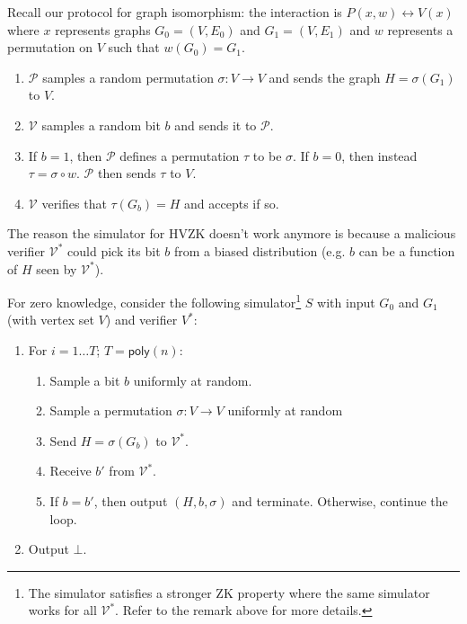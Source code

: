 \documentclass[12pt]{tufte-book}
\begin{document}
Recall our protocol for graph isomorphism: the interaction is $P(x,w) \leftrightarrow V(x)$ where $x$ represents graphs $G_0 = (V, E_0)$ and $G_1 = (V, E_1)$ and $w$ represents a permutation on $V$ such that $w (G_0) = G_1$.

\begin{enumerate}
\item $\mathcal{P}$ samples a random permutation $\sigma: V \to V$ and sends the graph $H = \sigma(G_1)$ to $V$.

\item $\mathcal{V}$ samples a random bit $b$ and sends it to $\mathcal{P}$.

\item If $b = 1$, then $\mathcal{P}$ defines a permutation $\tau$ to be $\sigma$. If $b = 0$, then instead $\tau = \sigma \circ w$. $\mathcal{P}$ then sends $\tau$ to $V$.

\item $\mathcal{V}$ verifies that $\tau(G_b) = H$ and accepts if so.

\end{enumerate}

The reason the simulator for HVZK doesn't work anymore is because a malicious verifier $\mathcal{V^*}$ could pick its bit $b$ from a biased distribution (e.g. $b$ can be a function of $H$ seen by $\mathcal{V^*}$).

For zero knowledge, consider the following simulator\footnote{The simulator satisfies a stronger ZK property where the same simulator works for all $\mathcal{V^*}$. Refer to the remark above for more details.} $S$ with input $G_0$ and $G_1$ (with vertex set $V$) and verifier $V^*$:

\begin{enumerate}
\item For $i = 1\dots T$; $T=\mathsf{poly}(n)$:
\begin{enumerate}
	\item Sample a bit $b$ uniformly at random.

	\item Sample a permutation $\sigma: V \to V$ uniformly at random

	\item Send $H = \sigma (G_b)$ to $\mathcal{V^*}$.

	\item Receive $b'$ from $\mathcal{V^*}$.

	\item If $b=b'$, then output $(H, b, \sigma)$ and terminate. Otherwise, continue the loop.
\end{enumerate}
\item Output $\bot$.

\end{enumerate}
\end{document}
